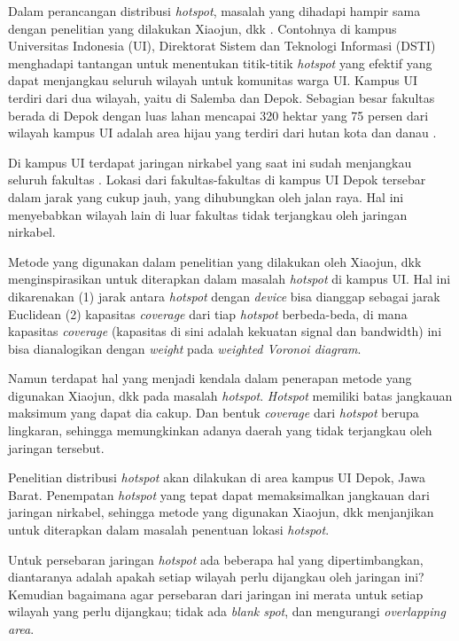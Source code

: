 Dalam perancangan distribusi \textit{hotspot}, masalah yang dihadapi hampir sama dengan penelitian yang dilakukan Xiaojun, dkk \cite{substation}. Contohnya di kampus Universitas Indonesia (UI), Direktorat Sistem dan Teknologi Informasi (DSTI) menghadapi tantangan untuk menentukan titik-titik \textit{hotspot} yang efektif yang dapat menjangkau seluruh wilayah untuk komunitas warga UI. Kampus UI terdiri dari dua wilayah, yaitu di Salemba dan Depok. Sebagian besar fakultas berada di Depok dengan luas lahan mencapai 320 hektar yang 75 persen dari wilayah kampus UI adalah area hijau yang terdiri dari hutan kota dan danau \cite{ui}. 

Di kampus UI terdapat jaringan nirkabel yang saat ini sudah menjangkau seluruh fakultas \cite{hotspot.ui}. Lokasi dari fakultas-fakultas di kampus UI Depok tersebar dalam jarak yang cukup jauh, yang dihubungkan oleh jalan raya. Hal ini menyebabkan wilayah lain di luar fakultas tidak terjangkau oleh jaringan nirkabel.

Metode yang digunakan dalam penelitian yang dilakukan oleh Xiaojun, dkk \cite{substation} menginspirasikan untuk diterapkan dalam masalah \textit{hotspot} di kampus UI. Hal ini dikarenakan (1) jarak antara \textit{hotspot} dengan \textit{device} bisa dianggap sebagai jarak Euclidean (2) kapasitas \textit{coverage} dari tiap \textit{hotspot} berbeda-beda, di mana kapasitas \textit{coverage} (kapasitas di sini adalah kekuatan signal dan bandwidth) ini bisa dianalogikan dengan \textit{weight} pada \textit{weighted Voronoi diagram}. 

Namun terdapat hal yang menjadi kendala dalam penerapan metode yang digunakan Xiaojun, dkk \cite{substation} pada masalah \textit{hotspot}. \textit{Hotspot} memiliki batas jangkauan maksimum yang dapat dia cakup. %
Dan bentuk \textit{coverage} dari \textit{hotspot} berupa lingkaran, sehingga memungkinkan adanya daerah yang tidak terjangkau oleh jaringan tersebut. %

Penelitian distribusi \textit{hotspot} akan dilakukan di area kampus UI Depok, Jawa Barat. Penempatan \textit{hotspot} yang tepat dapat memaksimalkan jangkauan dari jaringan nirkabel, %
sehingga metode yang digunakan Xiaojun, dkk \cite{substation} menjanjikan untuk diterapkan dalam masalah penentuan lokasi \textit{hotspot}.

Untuk persebaran jaringan \textit{hotspot} ada beberapa hal yang dipertimbangkan, diantaranya adalah apakah setiap wilayah perlu dijangkau oleh jaringan ini? Kemudian bagaimana agar persebaran dari jaringan ini merata untuk setiap wilayah yang perlu dijangkau; tidak ada \textit{blank spot}, dan mengurangi \textit{overlapping area}.

